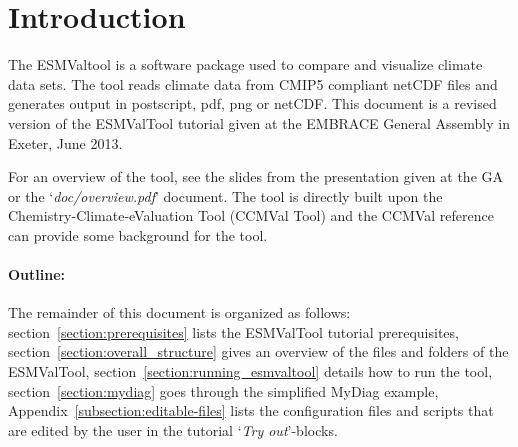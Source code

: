\documentclass[12pt]{article}
\newcommand{\docref}[1]{`\emph{#1}'}
\begin{document}
\maketitle

% 
% 
\section{Introduction}\label{section:introduction}
The ESMValtool is a software package used to compare and visualize
climate data sets. The tool reads climate data from CMIP5 compliant
netCDF files and generates output in postscript, pdf, png or netCDF.
This document is a revised version of the ESMValTool tutorial given at
the EMBRACE General Assembly in Exeter, June 2013. 

For an overview of the tool, see the slides from the presentation
given at the GA\cite{esmvaltool-presentation} or the
\docref{doc/overview.pdf} document. The tool is directly built upon
the Chemistry-Climate-eValuation Tool\cite{CCMVal-main:2012} (CCMVal
Tool) and the CCMVal reference can provide some background for the
tool.

\paragraph*{Outline:}
The remainder of this document is organized as follows:
section~\ref{section:prerequisites} lists the ESMValTool tutorial
prerequisites, section~\ref{section:overall_structure} gives an
overview of the files and folders of the ESMValTool,
section~\ref{section:running_esmvaltool} details how to run the tool,
section~\ref{section:mydiag} goes through the simplified MyDiag
example, Appendix~\ref{subsection:editable-files} lists the
configuration files and scripts that are edited by the user in the
tutorial `\emph{Try out}'-blocks.



% 
% 
\end{document}
